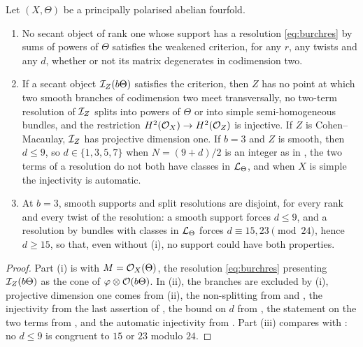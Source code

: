 \begin{corollary}
\label{cor:disjointroutes}
Let $(X,\Theta)$ be a principally polarised abelian fourfold.
\begin{enumerate}[label=\textup{(\roman*)},nosep]
\item No secant object of rank one whose support has a resolution
  \eqref{eq:burchres} by sums of powers of $\Theta$ satisfies the weakened
  criterion, for any $r$, any twists and any $d$, whether or not its matrix
  degenerates in codimension two.
\item If a secant object $\mathcal{I}_{Z}(b\Theta)$ satisfies the criterion, then
  $Z$ has no point at which two smooth branches of codimension two meet
  transversally, no two-term resolution of $\mathcal{I}_{Z}$ splits into powers of
  $\Theta$ or into simple semi-homogeneous bundles, and the restriction
  $H^{2}(\mathcal{O}_{X})\to H^{2}(\mathcal{O}_{Z})$ is injective. If $Z$ is
  Cohen--Macaulay, $\mathcal{I}_{Z}$ has projective dimension one. If $b=3$ and $Z$
  is smooth, then $d\le9$, so $d\in\{1,3,5,7\}$ when $N=(9+d)/2$ is an
  integer as in , the two terms of a resolution do not
  both have classes in $\mathcal{L}_{\Theta}$, and when $X$ is simple the
  injectivity is automatic.
\item At $b=3$, smooth supports and split resolutions are disjoint, for
  every rank and every twist of the resolution: a smooth support forces
  $d\le9$, and a resolution by bundles with classes in $\mathcal{L}_{\Theta}$ forces
  $d\equiv15,23\pmod{24}$, hence $d\ge15$, so that, even without (i), no
  support could have both properties.
\end{enumerate}
\end{corollary}

\begin{proof}
Part (i) is  with $M=\mathcal{O}_{X}(\Theta)$, the resolution
\eqref{eq:burchres} presenting $\mathcal{I}_{Z}(b\Theta)$ as the cone of
$\varphi\otimes\mathcal{O}(b\Theta)$. In (ii), the branches are excluded by
(i), projective dimension one comes from
(ii), the non-splitting from  and
, the injectivity from the last assertion of
, the bound on $d$ from
, the statement on the two terms from
, and the automatic injectivity from
. Part (iii) compares
 with : no $d\le9$ is
congruent to $15$ or $23$ modulo $24$.
\end{proof}
